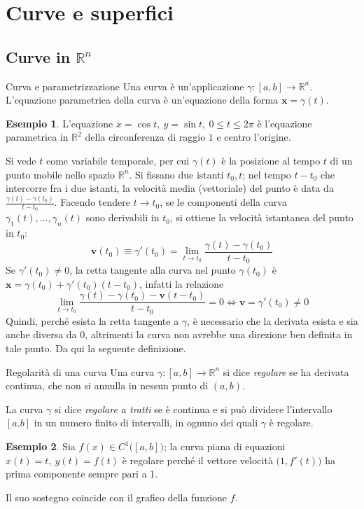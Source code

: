 \documentclass[10pt, a4paper]{scrartcl}
\theoremstyle{definition}
\newtheorem{esempio}{Esempio}
\numberwithin{esempio}{section}
\theoremstyle{definition}
\numberwithin{obs}{section}
\numberwithin{nota}{section}
\numberwithin{equation}{subsection}
\begin{document}
\section{Curve e superfici}
\subsection{Curve in $\mathbb{R}^n$}
\begin{definizione}
	{Curva e parametrizzazione}{}
	Una curva \`e un'applicazione $\gamma: [a,b] \to \mathbb{R}^n$. L'equazione parametrica della curva \`e un'equazione della forma $\mathbf{x}  = \gamma(t)$.
\end{definizione}
\begin{esempio}
L'equazione $x = \cos t , \ y = \sin t, \ 0\le t\le 2\pi$ \`e l'equazione parametrica in $\mathbb{R}^2$ della circonferenza di raggio $1$ e centro l'origine.
\end{esempio}
\noindent Si vede $t$ come variabile temporale, per cui $\gamma(t)$ \`e la posizione al tempo $t$ di un punto mobile nello spazio $\mathbb{R}^n$. 
Si fissano due istanti $t_0,t$; nel tempo $t-t_0$ che intercorre fra i due istanti, la velocit\`a media (vettoriale) del punto \`e data da $\frac{\gamma(t) - \gamma(t_0)}{t-t_0}$.
Facendo tendere $t\to t_0$, se le componenti della curva $\gamma_1(t) , \ldots, \gamma_n(t)$ sono derivabili in $t_0$, si ottiene la velocit\`a istantanea del punto in $t_0$:
\[
\mathbf{v} (t_0) \equiv \gamma'(t_0) = \lim_{t \to t_0} \frac{\gamma(t) - \gamma(t_0)}{t-t_0}
\] 
Se $\gamma'(t_0) \neq 0 $, la retta tangente alla curva nel punto $\gamma(t_{0})$ \`e $\mathbf{x} = \gamma(t_0) + \gamma'(t_0) ( t-t_0)$, infatti la relazione 
\[
\lim_{t \to t_0} \frac{\gamma(t) - \gamma(t_0) -\mathbf{v}(t-t_0)}{t-t_0} = 0 \iff \mathbf{v} = \gamma'(t_0)\neq 0
\] 
Quindi, perch\'e esista la retta tangente a $\gamma$, \`e necessario che la derivata esista e sia anche diversa da $0$, altrimenti la curva non avrebbe una direzione ben definita in tale punto.
Da qui la seguente definizione.
\begin{definizione}
	{Regolarit\`a di una curva}{}
	Una curva $\gamma:[a,b]  \to \mathbb{R}^n$ si dice \textit{regolare} se ha derivata continua, che non si annulla in nessun punto di $(a,b)$.

	La curva $\gamma$ si dice \textit{regolare a tratti} se \`e continua e si pu\`o dividere l'intervallo $[a.b]$ in un numero finito di intervalli, in ognuno dei quali $\gamma$ \`e regolare.
\end{definizione}
\begin{esempio}
	Sia $f(x) \in C^1\big([a,b]\big)$; la curva piana di equazioni $x(t) = t, \ y(t) = f(t)$ \`e regolare perch\'e il vettore velocit\`a $\big(1,f'(t)\big)$ ha prima componente sempre pari a $1$.

	Il suo sostegno coincide con il grafico della funzione $f$.
\end{esempio}
\end{document}
